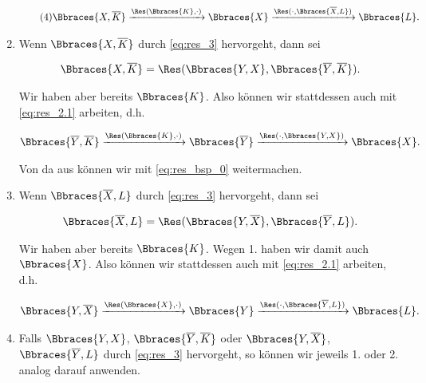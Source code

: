 \begin{solution}
\begin{enumerate}[label = \arabic*., start = 0]
    \begin{align} \label{eq:res_bsp_0} \tag{4}
        \Bbraces{X, \overline K}
        \xrightarrow{\Res(\Bbraces{K}, \cdot)}
        \Bbraces{X}
        \xrightarrow{\Res(\cdot, \Bbraces{\overline X, L})}
        \Bbraces{L}.
    \end{align}

    \item Wenn $\Bbraces{X, \overline K}$ durch \eqref{eq:res_3} hervorgeht, dann sei

    \begin{align*}
        \Bbraces{X, \overline K}
        =
        \Res(\Bbraces{Y, X}, \Bbraces{\overline Y, \overline K}).        
    \end{align*}

    Wir haben aber bereits $\Bbraces{K}$.
    Also können wir stattdessen auch mit \eqref{eq:res_2.1} arbeiten, d.h.

    \begin{align*}
        \Bbraces{\overline Y, \overline K}
        \xrightarrow{\Res(\Bbraces{K}, \cdot)}
        \Bbraces{\overline Y}
        \xrightarrow{\Res(\cdot, \Bbraces{Y, X})}
        \Bbraces{X}.
    \end{align*}

    Von da aus können wir mit \eqref{eq:res_bsp_0} weitermachen.

    \item Wenn $\Bbraces{\overline X, L}$ durch \eqref{eq:res_3} hervorgeht, dann sei
    
    \begin{align*}
        \Bbraces{\overline X, L}
        =
        \Res(\Bbraces{Y, \overline X}, \Bbraces{\overline Y, L}).
    \end{align*}

    Wir haben aber bereits $\Bbraces{K}$.
    Wegen 1. haben wir damit auch $\Bbraces{X}$.
    Also können wir stattdessen auch mit \eqref{eq:res_2.1} arbeiten, d.h.

    \begin{align*}
        \Bbraces{Y, \overline X}
        \xrightarrow{\Res(\Bbraces{X}, \cdot)}
        \Bbraces{Y}
        \xrightarrow{\Res(\cdot, \Bbraces{\overline Y, L})}
        \Bbraces{L}.
    \end{align*}

    \item Falls $\Bbraces{Y, X}$, $\Bbraces{\overline Y, \overline K}$ oder $\Bbraces{Y, \overline X}$, $\Bbraces{\overline Y, L}$ durch \eqref{eq:res_3} hervorgeht, so können wir jeweils 1. oder 2. analog darauf anwenden.


\end{enumerate}
\end{solution}
